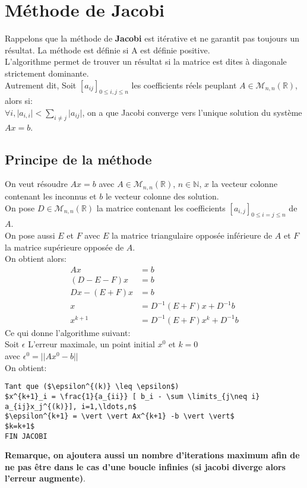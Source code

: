 \documentclass{report}
\begin{document}
\section{Méthode de Jacobi}
Rappelons que la méthode de \textbf{Jacobi} est itérative et ne garantit pas toujours un résultat. La méthode est définie si A est définie positive.\\
L'algorithme permet de trouver un résultat si la matrice est dites à diagonale strictement dominante. \\
Autrement dit, Soit $[a_{ij}]_{0 \leq i,j \leq n}$ les coefficients réels peuplant $A \in \mathcal{M}_{n,n} (\mathbb{R})$, alors si:\\
$\forall i, \vert a_{i,i} \vert <  \sum \limits_{i \neq j} \vert a_{ij} \vert$, on a que Jacobi converge vers l'unique solution du système $Ax=b$. 
\subsection{Principe de la méthode}
On veut résoudre $Ax=b$ avec $A \in \mathcal{M}_{n,n} (\mathbb{R})$, $n \in \mathbb{N}$, $x$ la vecteur colonne contenant les inconnus et $b$ le vecteur colonne des solution. \\
On pose $D \in \mathcal{M}_{n,n}(\mathbb{R})$ la matrice contenant les coefficients $[a_{i,j}]_{0 \leq i=j \leq n}$ de $A$. \\
On pose aussi $E$ et $F$ avec $E$ la matrice triangulaire opposée inférieure de $A$ et $F$ la matrice supérieure opposée de $A$.  \\
On obtient alors:
\begin{align}
Ax &=b \\
(D-E-F)x &= b \\
Dx -(E+F)x &= b \\
x &=D^{-1}(E+F)x+D^{-1}b \\
x^{k+1} &=D^{-1}(E+F)x^{k}+D^{-1}b 
\end{align}
Ce qui donne l'algorithme suivant: \\
Soit $\epsilon$ L'erreur maximale, un point initial $x^0$ et $k=0$ \\
avec $\epsilon^{0} = \vert \vert A x^0 -b \vert \vert$ \\
On obtient: 
\begin{lstlisting}[mathescape=true, frame=single]
Tant que ($\epsilon^{(k)} \leq \epsilon$)
$x^{k+1}_i = \frac{1}{a_{ii}} [ b_i - \sum \limits_{j\neq i} a_{ij}x_j^{(k)}], i=1,\ldots,n$
$\epsilon^{k+1} = \vert \vert Ax^{k+1} -b \vert \vert$
$k=k+1$
FIN JACOBI
\end{lstlisting}
\textbf{Remarque, on ajoutera aussi un nombre d'iterations maximum afin de ne pas être dans le cas d'une boucle infinies (si jacobi diverge alors l'erreur augmente)}.
\end{document}
